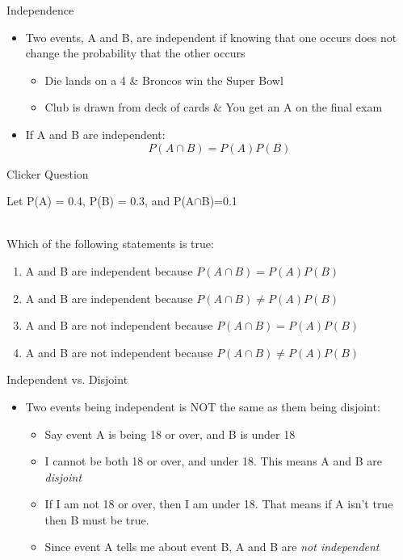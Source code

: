 \documentclass{beamer}
\begin{document}
\begin{frame}{Independence}
	
	\begin{itemize}
		\item Two events, A and B, are \alert{independent} if knowing that one occurs does not change the probability that the other occurs
			\begin{itemize}
		      	\item Die lands on a 4 \& Broncos win the Super Bowl
		      	\item Club is drawn from deck of cards \& You get an A on the final exam
			\end{itemize}
		
		\item If A and B are independent: \[
		    P(A \cap B) = P(A)P(B)
		\]	
	\end{itemize}
\end{frame}

\begin{frame}{Clicker Question}
	
	\begin{centering}
		Let P(A) = 0.4, P(B) = 0.3, and P(A$\cap$B)=0.1
	\end{centering}
	\\
	Which of the following statements is true:
	\begin{enumerate}[label=(\alph*)]
		\item A and B are independent because $P(A \cap B) = P(A)P(B)$
		\item A and B are independent because $P(A \cap B) \neq P(A)P(B)$
		\item A and B are not independent because $P(A \cap B) = P(A)P(B)$
		\item A and B are not independent because $P(A \cap B) \neq P(A)P(B)$
	\end{enumerate}
	
\end{frame}

\begin{frame}{Independent vs. Disjoint}
	
	\begin{itemize}
		\item Two events being independent is \alert{NOT} the same as them being disjoint:
		\begin{itemize}
			\item Say event A is being 18 or over, and B is under 18
			
			\item I cannot be both 18 or over, and under 18. This means A and B are \textit{disjoint}
			
			\item If I am not 18 or over, then I am under 18. That means if A isn't true then B must be true. 
				
			\item Since event A tells me about event B, A and B are \textit{not independent}
		\end{itemize}
	\end{itemize}
	
\end{frame}
\end{document}
